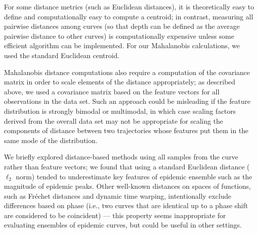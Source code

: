 \documentclass[fleqn,10pt,lineno]{wlpeerj}
\begin{document}
For some distance metrics (such as Euclidean distances), it is theoretically easy to define and computationally easy to compute a centroid; in contrast, measuring all pairwise distances among curves (so that depth can be defined as the average pairwise distance to other curves) is computationally expensive unless some efficient algorithm can be implemented. For our Mahalanobis calculations, we used the standard Euclidean centroid.

Mahalanobis distance computations also require a computation of the covariance matrix in order to scale elements of the distance appropriately; as described above, we used a covariance matrix based on the feature vectors for all observations in the data set. Such an approach could be misleading if the feature distribution is strongly bimodal or multimodal, in which case scaling factors derived from the overall data set may not be appropriate for scaling the components of distance between two trajectories whose features put them in the same mode of the distribution.

We briefly explored distance-based methods using all samples from the curve rather than feature vectors; we found that using a standard Euclidean distance ($\ell_2$ norm) tended to underestimate key features of epidemic ensemble such as the magnitude of epidemic peaks. Other well-known distances on spaces of functions, such as Fréchet distances and dynamic time warping, intentionally exclude differences based on phase (i.e., two curves that are identical up to a phase shift are considered to be coincident) --- this property seems inappropriate for evaluating ensembles of epidemic curves, but could be useful in other settings.


\end{document}
